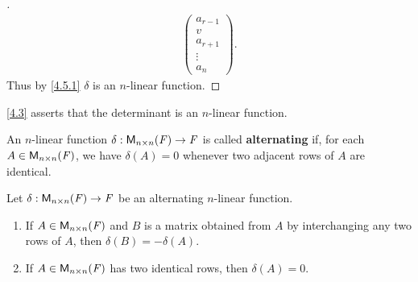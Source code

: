 \begin{proof}[]
\begin{align*}
\begin{pmatrix}
                                                              a_{r - 1} \\
                                                              v         \\
                                                              a_{r + 1} \\
                                                              \vdots    \\
                                                              a_n
                                                            \end{pmatrix}.
  \end{align*}
  Thus by \cref{4.5.1} \(\delta\) is an \(n\)-linear function.
\end{proof}

\begin{note}
  \cref{4.3} asserts that the determinant is an \(n\)-linear function.
\end{note}

\begin{defn}\label{4.5.5}
  An \(n\)-linear function \(\delta : \mathsf{M}_{{n} \times n}({\mathit{F}}) \to \mathit{F}\) is called \textbf{alternating} if, for each \(A \in \mathsf{M}_{{n} \times n}({\mathit{F}})\), we have \(\delta(A) = 0\) whenever two adjacent rows of \(A\) are identical.
\end{defn}

\begin{thm}\label{4.10}
  Let \(\delta : \mathsf{M}_{{n} \times n}({\mathit{F}}) \to \mathit{F}\) be an alternating \(n\)-linear function.
  \begin{enumerate}
    \item If \(A \in \mathsf{M}_{{n} \times n}({\mathit{F}})\) and \(B\) is a matrix obtained from \(A\) by interchanging any two rows of \(A\), then \(\delta(B) = -\delta(A)\).
    \item If \(A \in \mathsf{M}_{{n} \times n}({\mathit{F}})\) has two identical rows, then \(\delta(A) = 0\).
  \end{enumerate}
\end{thm}

